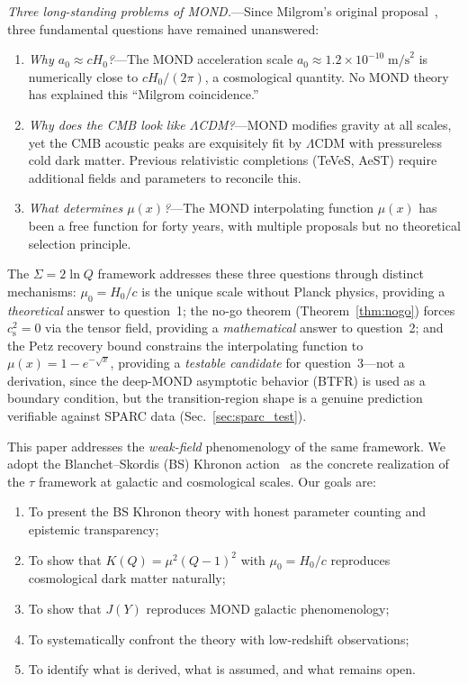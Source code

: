 \documentclass[prd,twocolumn,superscriptaddress,longbibliography,floatfix]{revtex4-2}
\newcommand{\tauasym}{\tau}
\newcommand{\cs}{c_{\mathrm{s}}}
\begin{document}
\emph{Three long-standing problems of MOND.}---Since Milgrom's
original proposal~\cite{Milgrom1983}, three fundamental questions
have remained unanswered:
\begin{enumerate}
\item \emph{Why $a_0 \approx cH_0$?}---The MOND acceleration
  scale $a_0 \approx 1.2 \times 10^{-10}\;\mathrm{m/s}^2$ is
  numerically close to $cH_0/(2\pi)$, a cosmological quantity.
  No MOND theory has explained this ``Milgrom coincidence.''
\item \emph{Why does the CMB look like $\Lambda$CDM?}---MOND
  modifies gravity at all scales, yet the CMB acoustic peaks
  are exquisitely fit by $\Lambda$CDM with pressureless cold dark
  matter.  Previous relativistic completions (TeVeS, AeST) require
  additional fields and parameters to reconcile this.
\item \emph{What determines $\mu(x)$?}---The MOND interpolating
  function $\mu(x)$ has been a free function for forty years,
  with multiple proposals but no theoretical selection principle.
\end{enumerate}
The $\Sigma = 2\ln Q$ framework addresses these three questions
through distinct mechanisms: $\mu_0 = H_0/c$ is the unique scale
without Planck physics, providing a \emph{theoretical} answer to
question~1; the no-go theorem (Theorem~\ref{thm:nogo}) forces
$\cs^2 = 0$ via the tensor field, providing a \emph{mathematical}
answer to question~2; and the Petz recovery bound constrains the
interpolating function to $\mu(x) = 1 - e^{-\sqrt{x}}$, providing
a \emph{testable candidate} for question~3---not a derivation, since
the deep-MOND asymptotic behavior (BTFR) is used as a boundary
condition, but the transition-region shape is a genuine prediction
verifiable against SPARC data (Sec.~\ref{sec:sparc_test}).

This paper addresses the \emph{weak-field} phenomenology of the
same framework.  We adopt the Blanchet--Skordis (BS) Khronon
action~\cite{BS2024} as the concrete realization of the $\tauasym$
framework at galactic and cosmological scales.  Our goals are:
\begin{enumerate}
\item To present the BS Khronon theory with honest parameter
  counting and epistemic transparency;
\item To show that $K(Q) = \mu^2(Q-1)^2$ with $\mu_0 = H_0/c$
  reproduces cosmological dark matter naturally;
\item To show that $J(Y)$ reproduces MOND galactic phenomenology;
\item To systematically confront the theory with low-redshift
  observations;
\item To identify what is derived, what is assumed, and what
  remains open.
\end{enumerate}
\end{document}

